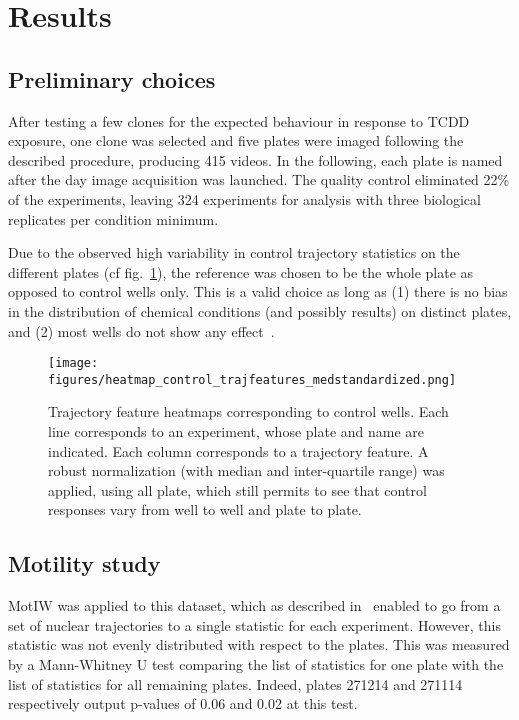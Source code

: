 \section{Results}
\subsection{Preliminary choices}
After testing a few clones for the expected behaviour in response to TCDD exposure, one clone was selected and five plates were imaged following the described procedure, producing 415 videos. In the following, each plate is named after the day image acquisition was launched. The quality control eliminated 22\% of the experiments, leaving 324 experiments for analysis with three biological replicates per condition minimum.

Due to the observed high variability in control trajectory statistics on the different plates (cf fig.~\ref{control_heatmap}), the reference was chosen to be the whole plate as opposed to control wells only. This is a valid choice as long as (1) there is no bias in the distribution of chemical conditions (and possibly results) on distinct plates, and (2) most wells do not show any effect~\cite{pmid19644458}. 
\begin{figure}
\centering
\texttt{[image: figures/heatmap\_control\_trajfeatures\_medstandardized.png]}
\caption{Trajectory feature heatmaps corresponding to control wells. Each line corresponds to an experiment, whose plate and name are indicated. Each column corresponds to a trajectory feature. A robust normalization (with median and inter-quartile range) was applied, using all plate, which still permits to see that control responses vary from well to well and plate to plate.}
\label{control_heatmap}
\end{figure}

\subsection{Motility study}
\label{sec:xb_motility}
MotIW was applied to this dataset, which as described in~\cite{motiw} enabled to go from a set of nuclear trajectories to a single statistic for each experiment. However, this statistic was not evenly distributed with respect to the plates. This was measured by a Mann-Whitney U test comparing the list of statistics for one plate with the list of statistics for all remaining plates. Indeed, plates 271214 and 271114 respectively output p-values of 0.06 and 0.02 at this test.

